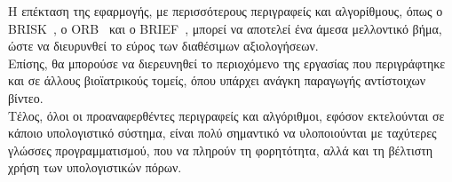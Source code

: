 Η επέκταση της εφαρμογής, με περισσότερους περιγραφείς και αλγορίθμους, όπως ο BRISK~\cite{leutenegger2011brisk}, ο ORB~\cite{rublee2011orb} και ο BRIEF~\cite{calonder2010brief}, μπορεί να αποτελεί ένα άμεσα μελλοντικό βήμα, 
ώστε να διευρυνθεί το εύρος των διαθέσιμων αξιολογήσεων.\\
Επίσης, θα μπορούσε να διερευνηθεί το περιοχόμενο της εργασίας που περιγράφτηκε και σε άλλους βιοϊατρικούς τομείς, όπου υπάρχει ανάγκη παραγωγής αντίστοιχων βίντεο.\\
Τέλος, όλοι οι προαναφερθέντες περιγραφείς και αλγόριθμοι, εφόσον εκτελούνται σε κάποιο υπολογιστικό σύστημα, είναι πολύ σημαντικό 
να υλοποιούνται με ταχύτερες γλώσσες προγραμματισμού, που να πληρούν τη φορητότητα, αλλά και τη βέλτιστη χρήση των υπολογιστικών πόρων.

















